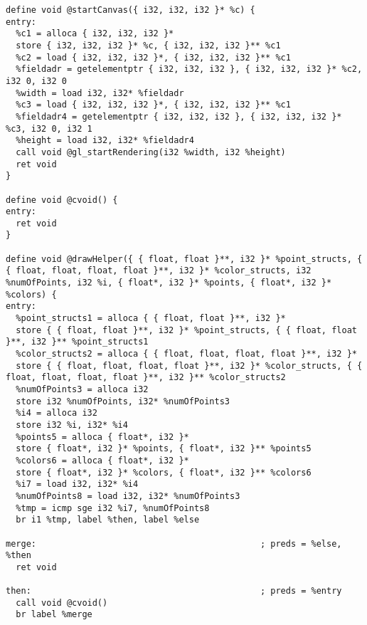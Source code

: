 \documentclass[main.tex]{subfiles}
\begin{document}
{\begin{lstlisting}
define void @startCanvas({ i32, i32, i32 }* %c) {
entry:
  %c1 = alloca { i32, i32, i32 }*
  store { i32, i32, i32 }* %c, { i32, i32, i32 }** %c1
  %c2 = load { i32, i32, i32 }*, { i32, i32, i32 }** %c1
  %fieldadr = getelementptr { i32, i32, i32 }, { i32, i32, i32 }* %c2, i32 0, i32 0
  %width = load i32, i32* %fieldadr
  %c3 = load { i32, i32, i32 }*, { i32, i32, i32 }** %c1
  %fieldadr4 = getelementptr { i32, i32, i32 }, { i32, i32, i32 }* %c3, i32 0, i32 1
  %height = load i32, i32* %fieldadr4
  call void @gl_startRendering(i32 %width, i32 %height)
  ret void
}

define void @cvoid() {
entry:
  ret void
}

define void @drawHelper({ { float, float }**, i32 }* %point_structs, { { float, float, float, float }**, i32 }* %color_structs, i32 %numOfPoints, i32 %i, { float*, i32 }* %points, { float*, i32 }* %colors) {
entry:
  %point_structs1 = alloca { { float, float }**, i32 }*
  store { { float, float }**, i32 }* %point_structs, { { float, float }**, i32 }** %point_structs1
  %color_structs2 = alloca { { float, float, float, float }**, i32 }*
  store { { float, float, float, float }**, i32 }* %color_structs, { { float, float, float, float }**, i32 }** %color_structs2
  %numOfPoints3 = alloca i32
  store i32 %numOfPoints, i32* %numOfPoints3
  %i4 = alloca i32
  store i32 %i, i32* %i4
  %points5 = alloca { float*, i32 }*
  store { float*, i32 }* %points, { float*, i32 }** %points5
  %colors6 = alloca { float*, i32 }*
  store { float*, i32 }* %colors, { float*, i32 }** %colors6
  %i7 = load i32, i32* %i4
  %numOfPoints8 = load i32, i32* %numOfPoints3
  %tmp = icmp sge i32 %i7, %numOfPoints8
  br i1 %tmp, label %then, label %else

merge:                                            ; preds = %else, %then
  ret void

then:                                             ; preds = %entry
  call void @cvoid()
  br label %merge


\end{lstlisting}}
\end{document}

